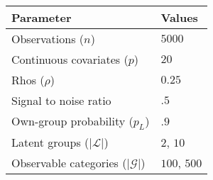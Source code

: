 \begin{tabular}{l|l}
 \hline
 Parameter & Values\\
 \hline
Observations ($n$)   & $5000$ \\
Continuous covariates ($p$)  &   $20$ \\
Rhos ($\rho$) & $0.25$\\
Signal to noise ratio & $.5$ \\
Own-group probability ($p_{L}$) & $.9$ \\
Latent groups ($|\mathcal{L}|$) & $2$, $10$ \\
Observable categories  ($|\mathcal{G}|$)  & $100$, $500$ \\
\hline
\end{tabular}
